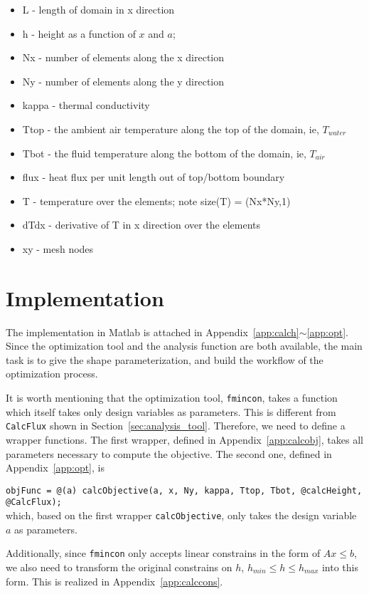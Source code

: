 \documentclass[a4paper]{article}
\begin{document}
\begin{itemize}
  \item   L - length of domain in x direction
  \item   h - height as a function of $x$ and $a$;
  \item   Nx - number of elements along the x direction
  \item   Ny - number of elements along the y direction
  \item   kappa - thermal conductivity
  \item   Ttop - the ambient air temperature along the top of the domain, ie, $T_{water}$
  \item   Tbot - the fluid temperature along the bottom of the domain, ie, $T_{air}$
  \item   flux - heat flux per unit length out of top/bottom boundary
   \item   T - temperature over the elements; note size(T) = (Nx*Ny,1)
  \item   dTdx - derivative of T in x direction over the elements
  \item   xy - mesh nodes
\end{itemize}

\section{Implementation}
The implementation in Matlab is attached in Appendix~\ref{app:calch}$\sim$\ref{app:opt}. 
Since the optimization tool and the analysis function are both available, the main task is to give the shape parameterization, and build the workflow of the optimization process. 

It is worth mentioning that the optimization tool, \texttt{fmincon}, takes a function which itself takes only design variables as parameters. This is different from \texttt{CalcFlux} shown in Section~\ref{sec:analysis_tool}. Therefore, we need to define a wrapper functions. The first wrapper, defined in Appendix~\ref{app:calcobj}, takes all parameters necessary to compute the objective. The second one, defined in Appendix~\ref{app:opt}, is 

\texttt{objFunc = @(a) calcObjective(a, x, Ny, kappa, Ttop, Tbot, @calcHeight, @CalcFlux);}\\
which, based on the first wrapper \texttt{calcObjective}, only takes the design variable $a$ as parameters.

Additionally, since \texttt{fmincon} only accepts linear constrains in the form of $Ax \le b$, we also need to transform the original constrains on $h$, $h_{min} \le h \le h_{max}$ into this form. This is realized in Appendix~\ref{app:calccons}.
\end{document}
